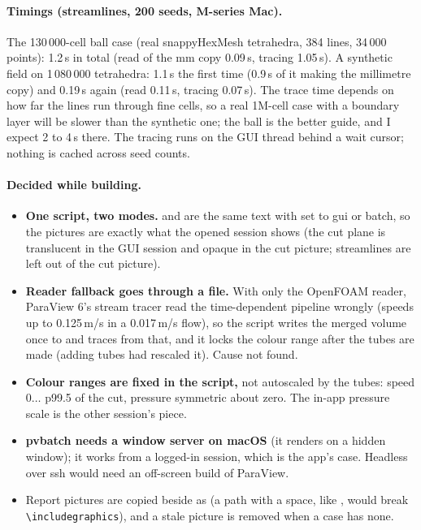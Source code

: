 \paragraph{Timings (streamlines, 200 seeds, M-series Mac).} The 130\,000-cell ball case (real snappyHexMesh tetrahedra,
384 lines, 34\,000 points): 1.2\,s in total (read of the mm copy 0.09\,s, tracing 1.05\,s). A synthetic field on
1\,080\,000 tetrahedra: 1.1\,s the first time (0.9\,s of it making the millimetre copy) and 0.19\,s again (read 0.11\,s,
tracing 0.07\,s). The trace time depends on how far the lines run through fine cells, so a real 1M-cell case with a
boundary layer will be slower than the synthetic one; the ball is the better guide, and I expect 2 to 4\,s there. The
tracing runs on the GUI thread behind a wait cursor; nothing is cached across seed counts.

\paragraph{Decided while building.}
\begin{itemize}[nosep]
  \item \textbf{One script, two modes.}  and  are the same text with  set to
        gui or batch, so the pictures are exactly what the opened session shows (the cut plane is translucent in the
        GUI session and opaque in the cut picture; streamlines are left out of the cut picture).
  \item \textbf{Reader fallback goes through a file.} With only the OpenFOAM reader, ParaView 6's stream tracer read
        the time-dependent pipeline wrongly (speeds up to 0.125\,m/s in a 0.017\,m/s flow), so the script writes the
        merged volume once to  and traces from that, and it locks the colour range after
        the tubes are made (adding tubes had rescaled it). Cause not found.
  \item \textbf{Colour ranges are fixed in the script,} not autoscaled by the tubes: speed $0\ldots$ p99.5 of the cut,
        pressure symmetric about zero. The in-app pressure scale is the other session's piece.
  \item \textbf{pvbatch needs a window server on macOS} (it renders on a hidden window); it works from a logged-in
        session, which is the app's case. Headless over ssh would need an off-screen build of ParaView.
  \item Report pictures are copied beside  as  (a path with a space, like
        , would break \verb|\includegraphics|), and a stale picture is removed when a case has none.
\end{itemize}

